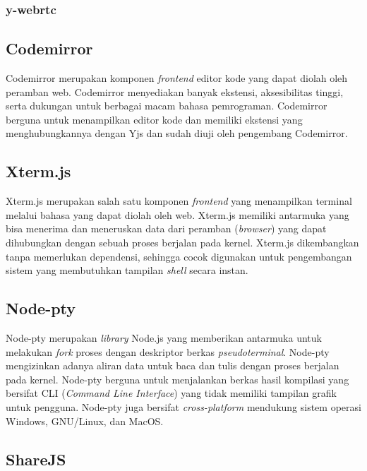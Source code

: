 \subsubsection{y-webrtc}

\subsection{Codemirror}

Codemirror merupakan komponen \textit{frontend} editor kode yang dapat diolah oleh peramban web. Codemirror menyediakan banyak ekstensi, aksesibilitas tinggi, serta dukungan untuk berbagai macam bahasa pemrograman. Codemirror berguna untuk menampilkan editor kode dan memiliki ekstensi yang menghubungkannya dengan Yjs dan sudah diuji oleh pengembang Codemirror.

\subsection{Xterm.js}

Xterm.js merupakan salah satu komponen \textit{frontend} yang menampilkan terminal melalui bahasa yang dapat diolah oleh web. Xterm.js memiliki antarmuka yang bisa menerima dan meneruskan data dari peramban (\textit{browser}) yang dapat dihubungkan dengan sebuah proses berjalan pada kernel. Xterm.js dikembangkan tanpa memerlukan dependensi, sehingga cocok digunakan untuk pengembangan sistem yang membutuhkan tampilan \textit{shell} secara instan.

\subsection{Node-pty}

Node-pty merupakan \textit{library} Node.js yang memberikan antarmuka untuk melakukan \textit{fork} proses dengan deskriptor berkas \textit{pseudoterminal}. Node-pty mengizinkan adanya aliran data untuk baca dan tulis dengan proses berjalan pada kernel. Node-pty berguna untuk menjalankan berkas hasil kompilasi yang bersifat CLI (\textit{Command Line Interface}) yang tidak memiliki tampilan grafik untuk pengguna. Node-pty juga bersifat \textit{cross-platform} mendukung sistem operasi Windows, GNU/Linux, dan MacOS.

\subsection{ShareJS}




